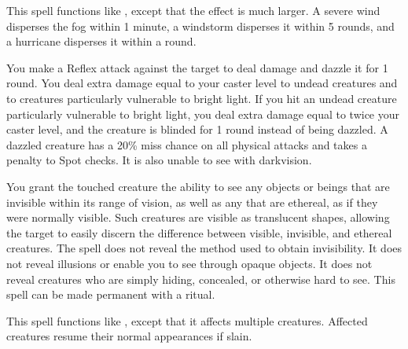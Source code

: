 \spelleffect This spell functions like , except that the effect is much larger.
\spellnotes A severe wind disperses the fog within 1 minute, a windstorm disperses it within 5 rounds, and a hurricane disperses it within a round. \fogspellnotes

\spelleffect You make a Reflex attack against the target to deal damage and dazzle it for 1 round. You deal extra damage equal to your caster level to undead creatures and to creatures particularly vulnerable to bright light. If you hit an undead creature particularly vulnerable to bright light, you deal extra damage equal to twice your caster level, and the creature is blinded for 1 round instead of being dazzled.
\spellnotes A dazzled creature has a 20\% miss chance on all physical attacks and takes a  penalty to Spot checks. It is also unable to see with darkvision.

\spelldur{\durlong \dismissable}
\spelleffect You grant the touched creature the ability to see any objects or beings that are invisible within its range of vision, as well as any that are ethereal, as if they were normally visible. Such creatures are visible as translucent shapes, allowing the target to easily discern the difference between visible, invisible, and ethereal creatures.
\spellnotes The spell does not reveal the method used to obtain invisibility. It does not reveal illusions or enable you to see through opaque objects. It does not reveal creatures who are simply hiding, concealed, or otherwise hard to see.
This spell can be made permanent with a  ritual.

\spelldur{\durlong \dismissable}
\spelleffect This spell functions like , except that it affects multiple creatures. Affected creatures resume their normal appearances if slain.


